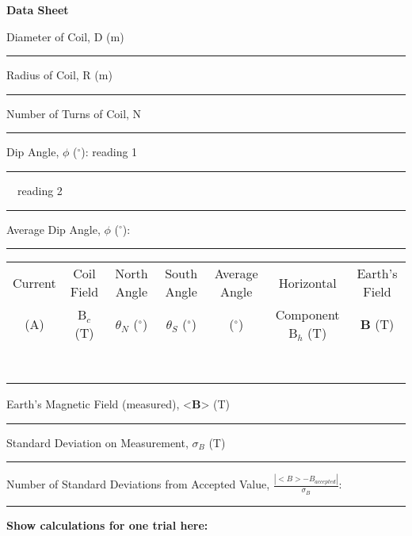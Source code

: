 \newpage

{\centering \textbf{Data Sheet}\par}


Diameter of Coil, D (m)  \rule{2cm}{.1pt}  

Radius of Coil, R (m) \rule{2cm}{.1pt} 

Number of Turns of Coil, N  \rule{2cm}{.1pt}

Dip Angle, \( \phi  \) (\( ^{\circ } \)): reading 1 \rule{1cm}{.1pt}
~~reading 2 \rule{1cm}{.1pt}

Average Dip Angle, \( \phi  \) (\( ^{\circ } \)): \rule{2cm}{.1pt}

\vspace{0.3cm}
\begin{tabular}{|c|c|c|c|c|c|c|}
\hline 
Current  &
Coil Field &
North Angle &
South Angle &
Average Angle &
Horizontal &
Earth's Field \\
(A)&
B\( _{c} \) (T)&
\( \theta  \)\( _{N} \) (\( ^{\circ } \))&
\( \theta  \)\( _{S} \) (\( ^{\circ } \))&
(\( ^{\circ } \))&
Component B\( _{h} \) (T)&
\textbf{B} (T)\\
\hline 
&
&
&
&
&
&
\\
\hline 
&
&
&
&
&
&
\\
\hline 
&
&
&
&
&
&
\\
\hline 
&
&
&
&
&
&
\\
\hline 
&
&
&
&
&
&
\\
\hline 
&
&
&
&
&
&
\\
\hline 
&
&
&
&
&
&
\\
\hline 
&
&
&
&
&
&
\\
\hline
\end{tabular}
\vspace{0.3cm}

\vspace{15mm}
Earth's Magnetic Field (measured), <\textbf{B}> (T) \rule{2cm}{.1pt}

Standard Deviation on Measurement, \( \sigma _{B} \) (T) \rule{2cm}{.1pt}

Number of Standard Deviations from Accepted Value, \( \frac{\left| <B>-B_{accepted}\right| }{\sigma _{B}} \):
\rule{2cm}{.1pt} 

\textbf{Show calculations for one trial here:}
